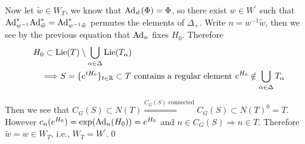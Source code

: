 Now let $\tilde{w}\in W_T$, we know that $\text{Ad}_{\tilde{w}}(\Phi)=\Phi$, so there exist $w\in W^\prime$ such that 
$\text{Ad}_{w^{-1}}^*\text{Ad}_{\tilde{w}}^*=\text{Ad}^*_{w^{-1}\tilde{w}}$ permutes the elements of $\Delta_+$. Write $n=w^{-1}\tilde{w}$, then 
we see by the previous equation that $\text{Ad}_n$ fixes $H_0$. Therefore 
\begin{equation}
    \begin{aligned}
        &H_0 \subset \text{Lie}(T)\setminus \bigcup_{\alpha\in\Delta}\text{Lie}(T_\alpha)\\
        &\quad\Longrightarrow S = \{e^{tH_0}\}_{t\in\mathbb{R}}\subset T \text{ contains a regular element }
        e^{H_0}\notin\bigcup_{\alpha\in\Delta}T_\alpha
    \end{aligned}
\end{equation}

Then we see that $C_G(S)\subset N(T)\overset{C_G(S)\text{ connected}}{\Longrightarrow}C_G(S)\subset N(T)^0=T$. However
$c_n(e^{H_0})=\exp(\text{Ad}_n(H_0))=e^{H_0}$ and $n\in C_G(S)\Rightarrow n\in T$. Therefore $\tilde{w}=w\in W_T$, i.e., 
$W_T=W^\prime$.\qed 

